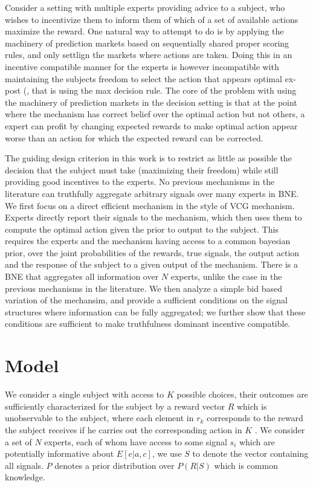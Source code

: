 
Consider a setting with multiple experts providing advice to a subject, who wishes to incentivize them to inform them of which of a set of available actions maximize the reward.
One natural way to attempt to do is by applying the machinery of prediction markets based on sequentially shared proper scoring rules, and only settlign the markets where actions are taken. Doing this in an incentive compatible manner for the experts is however incompatible with maintaining the subjects freedom to select the action that appears optimal ex-post (\cite{othman2010decision,  chen2014eliciting}, that is using the max decision rule. 
The core of the problem with using the machinery of prediction markets in the decision setting is that at the point where the mechanism has correct belief over the optimal action but not others, a expert  can profit by changing expected rewards to make optimal action appear worse than an action for which the expected reward can be corrected.


The guiding design criterion in this work is to restrict as little as possible the decision that the subject must take (maximizing their freedom) while still providing good incentives to the experts. No previous mechanisms in the literature can truthfully aggregate arbitrary signals over many experts in BNE. 
We first focus on a direct efficient mechanism in the style of VCG mechanism. Experts directly report their signals to the mechanism, which then uses them to compute the optimal action given the prior to output to the subject. This requires  the experts and the mechanism having access to a common bayesian prior, over the joint probabilities of the rewards, true signals, the output action and the response of the subject to a given output of the mechanism. There is a BNE that aggregates all information over $N$ experts, unlike the case in the previous mechanisms in the literature.
We then analyze a simple bid based variation of the mechansim, and provide a sufficient conditions on the signal structures where information can be fully aggregated; we further show that these conditions are sufficient to make truthfulness dominant incentive compatible.  




\section{Model}

We consider a single subject with access to $K$ possible choices, their outcomes are sufficiently characterized for the subject by a reward vector $R$ which is unobservable to the subject, where each element in $r_k$ corresponds to the reward the subject receives if he carries out the corresponding action in $K$ . We consider a set of $N$ experts, each of whom have access to some signal $s_i$ which are potentially informative about $E[e|a,c]$, we use $S$ to denote the vector containing all signals.  $P$ denotes a prior distribution over $P(R|S) $ which is common knowledge.

